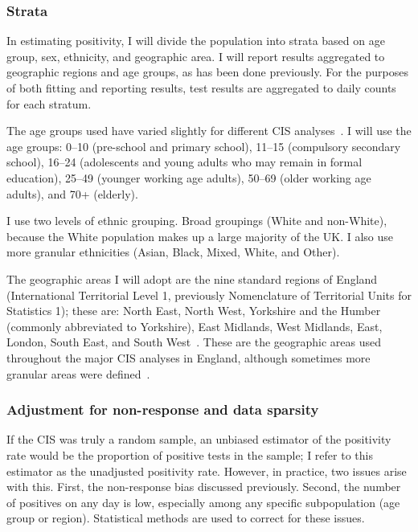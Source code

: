 \documentclass[thesis.tex]{subfiles}
\begin{document}
\subsubsection{Strata} \label{biology-data:sec:cis-strata}

In estimating positivity, I will divide the population into strata based on age group, sex, ethnicity, and geographic area.
I will report results aggregated to geographic regions and age groups, as has been done previously.
For the purposes of both fitting and reporting results, test results are aggregated to daily counts for each stratum.

The age groups used have varied slightly for different CIS analyses~\autocite[e.g.][]{pouwelsMRPvaccination,pouwelsCommunity,cisMethodsONS,houseInferring,walkerTracking}.
I will use the age groups: 0--10 (pre-school and primary school), 11--15 (compulsory secondary school), 16--24 (adolescents and young adults who may remain in formal education), 25--49 (younger working age adults), 50--69 (older working age adults), and 70+ (elderly).

I use two levels of ethnic grouping.
Broad groupings (White and non-White), because the White population makes up a large majority of the UK.
I also use more granular ethnicities (Asian, Black, Mixed, White, and Other).

The geographic areas I will adopt are the nine standard regions of England (International Territorial Level 1, previously Nomenclature of Territorial Units for Statistics 1); these are: North East, North West, Yorkshire and the Humber (commonly abbreviated to Yorkshire), East Midlands, West Midlands, East, London, South East, and South West~\autocite{onsRegions}.
These are the geographic areas used throughout the major CIS analyses in England, although sometimes more granular areas were defined~\autocite[e.g.][]{pouwelsMRPvaccination,pouwelsCommunity,cisMethodsONS,houseInferring,walkerTracking}.

\subsubsection{Adjustment for non-response and data sparsity} \label{biology-data:sec:MRP}

If the CIS was truly a random sample, an unbiased estimator of the positivity rate would be the proportion of positive tests in the sample; I refer to this estimator as the unadjusted positivity rate.
However, in practice, two issues arise with this.
First, the non-response bias discussed previously.
Second, the number of positives on any day is low, especially among any specific subpopulation (\eg age group or region).
Statistical methods are used to correct for these issues.
\end{document}
